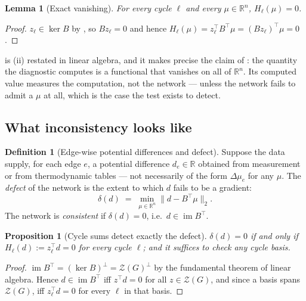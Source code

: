 \documentclass[11pt,twocolumn,a4paper]{article}
\theoremstyle{pstyle}
\newtheorem{lemma}[theorem]{Lemma}
\newtheorem{proposition}[theorem]{Proposition}
\theoremstyle{definition}
\newtheorem{definition}[theorem]{Definition}
\theoremstyle{remark}
\newcommand{\R}{\mathbb{R}}
\newcommand{\norm}[1]{\lVert#1\rVert}
\newcommand{\hol}{H}
\begin{document}
\begin{lemma}[Exact vanishing]
\label{lem:vanish}
For every cycle $\ell$ and every $\mu\in\R^{n}$, $\hol_\ell(\mu)=0$.
\end{lemma}

\begin{proof}
$z_\ell\in\ker B$ by , so
$B z_\ell = 0$ and hence $\hol_\ell(\mu)=z_\ell^{\top}B^{\top}\mu
= (Bz_\ell)^{\top}\mu = 0$.
\end{proof}

 is (ii) restated in linear
algebra, and it makes precise the claim of : the
quantity the diagnostic computes is a functional that vanishes on all of
$\R^n$. Its computed value measures the computation, not the network ---
unless the network fails to admit a $\mu$ at all, which is the case the
test exists to detect.

\subsection{What inconsistency looks like}

\begin{definition}[Edge-wise potential differences and defect]
\label{def:defect}
Suppose the data supply, for each edge $e$, a potential difference
$d_e\in\R$ obtained from measurement or from thermodynamic tables ---
not necessarily of the form $\Delta\mu_e$ for any $\mu$. The
\emph{defect} of the network is the extent to which $d$ fails to be a
gradient:
\begin{equation}
  \delta(d) \;=\; \min_{\mu\in\R^{n}} \norm{d - B^{\top}\mu}_{2}.
  \label{eq:defect}
\end{equation}
The network is \emph{consistent} if $\delta(d)=0$, i.e.\ $d\in
\operatorname{im}B^{\top}$.
\end{definition}

\begin{proposition}[Cycle sums detect exactly the defect]
\label{prop:detect-defect}
$\delta(d)=0$ if and only if $\hol_\ell(d) := z_\ell^{\top}d = 0$ for
every cycle $\ell$; and it suffices to check any cycle basis.
\end{proposition}

\begin{proof}
$\operatorname{im}B^{\top} = (\ker B)^{\perp} = \mathcal{Z}(G)^{\perp}$
by the fundamental theorem of linear algebra. Hence $d\in
\operatorname{im}B^{\top}$ iff $z^{\top}d=0$ for all
$z\in\mathcal{Z}(G)$, and since a basis spans $\mathcal{Z}(G)$, iff
$z_\ell^{\top}d=0$ for every $\ell$ in that basis.
\end{proof}
\end{document}
